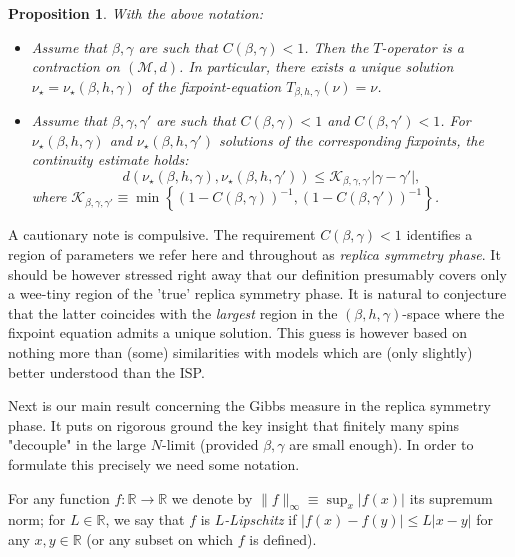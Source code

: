 \documentclass[a4paper,12pt,oneside,reqno]{amsart}
\numberwithin{equation}{section}
\newtheorem{prop}[teor]{Proposition}
\begin{document}
\begin{prop} \label{prop_contraction} With the above notation: 
\begin{itemize}
\item[i)] Assume that ${\beta}, \gamma$ are such that $C({\beta}, \gamma) < 1$. Then the $T$-operator is a contraction on $(\mathcal M, d)$. In particular, there exists a unique solution $\nu_\star= \nu_\star({\beta}, h, \gamma)$ of the fixpoint-equation $T_{{\beta}, h, \gamma}(\nu) = \nu$.  
\item[ii)] Assume that ${\beta}, \gamma, \gamma'$ are such that $C({\beta},\gamma)<1$ and $C({\beta},\gamma')<1$.
For $\nu_\star\left({\beta},h,\gamma \right)$ and $\nu_\star\left({\beta},h,\gamma' \right)$ solutions of the corresponding fixpoints, the continuity estimate holds: 
\begin{equation} \label{Tcontinuous}
d(\nu_\star\left({\beta},h,\gamma \right),\nu_\star\left({\beta},h,\gamma' \right))\leq \mathcal K_{{\beta}, \gamma, \gamma'} \left| \gamma-\gamma' \right|,
\end{equation}
where $\mathcal K_{{\beta}, \gamma, \gamma'} {\equiv} \min\left\{  \left( 1-C(\beta, \gamma)\right)^{-1},  \left( 1-C(\beta, \gamma')\right)^{-1}\right\}$.
\end{itemize}
\end{prop}

A cautionary note is compulsive. The requirement $C({\beta}, \gamma) < 1$ identifies a region of parameters we refer here and throughout as \emph{replica symmetry phase}. It should be however stressed right away that our definition presumably covers only a wee-tiny region of the 'true' replica symmetry phase. It is natural to conjecture that the latter coincides with the {\it largest} region in the $({\beta}, h, \gamma)$-space where the fixpoint equation admits a unique solution. This guess is however based on nothing more than (some) similarities with models which are (only slightly) better understood than the ISP. 

Next is our main result concerning the Gibbs measure in the replica symmetry phase. It puts on rigorous ground the key insight that finitely many spins "decouple" in the large $N$-limit (provided ${\beta}, \gamma$ are small enough). In order to formulate this precisely we need some notation. 

For any function $f: {\mathbb{R}} \to {\mathbb{R}}$ we denote by $\| f\|_\infty {\equiv} \sup_x  |f(x)|$ its supremum norm; for $L \in {\mathbb{R}}$, we say that $f$ is {\it $L$-Lipschitz} if  $|f(x)- f(y)|\leq L |x-y|$ for any $x,y \in {\mathbb{R}}$ (or any subset on which $f$ is defined). 
\end{document}
